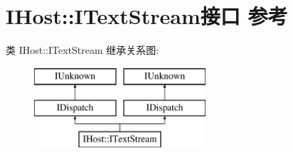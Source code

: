 \hypertarget{interface_i_host_1_1_i_text_stream}{}\section{I\+Host\+:\+:I\+Text\+Stream接口 参考}
\label{interface_i_host_1_1_i_text_stream}
类 I\+Host\+:\+:I\+Text\+Stream 继承关系图\+:\begin{figure}[H]
\begin{center}
\leavevmode
\includegraphics[height=3.000000cm]{interface_i_host_1_1_i_text_stream}
\end{center}
\end{figure}
